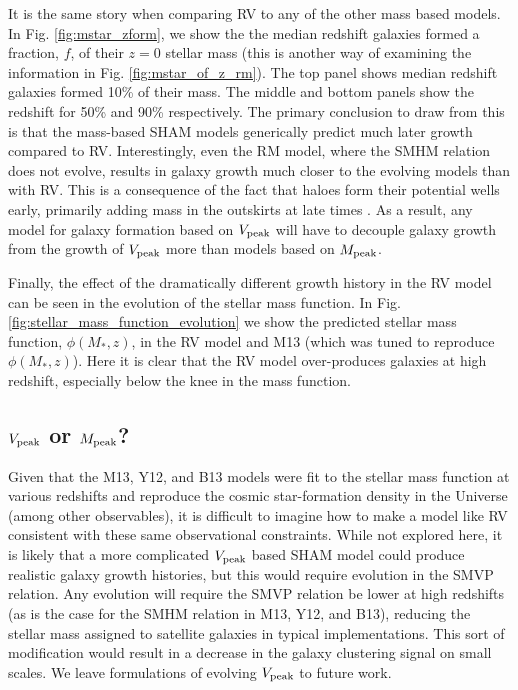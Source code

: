 \documentclass[a4paper,fleqn,usenatbib]{mnras}
\begin{document}
It is the same story when comparing RV to any of the other mass based models.  In Fig. \ref{fig:mstar_zform}, we show the the median redshift galaxies formed a fraction, $f$, of their $z=0$ stellar mass (this is another way of examining the information in Fig. \ref{fig:mstar_of_z_rm}).  The top panel shows median redshift galaxies formed 10\% of their mass.  The middle and bottom panels show the redshift for 50\% and 90\% respectively.  The primary conclusion to draw from this is that the mass-based SHAM models generically predict much later growth compared to RV.  Interestingly, even the RM model, where the SMHM relation does not evolve, results in galaxy growth much closer to the evolving models than with RV.  This is a consequence of the fact that haloes form their potential wells early, primarily adding mass in the outskirts at late times \citep{Bosch:2014cu}.  As a result, any model for galaxy formation based on $V_{\rm peak}$ will have to decouple galaxy growth from the growth of $V_{\rm peak}$ more than models based on $M_{\rm peak}$.        

Finally, the effect of the dramatically different growth history in the RV model can be seen in the evolution of the stellar mass function.  In Fig. \ref{fig:stellar_mass_function_evolution} we show the predicted stellar mass function, $\phi(M_*,z)$, in the RV model and M13 (which was tuned to reproduce $\phi(M_*,z)$).  Here it is clear that the RV model over-produces galaxies at high redshift, especially below the knee in the mass function.


\subsection{$V_{\rm peak}$ or $M_{\rm peak}$?}

Given that the M13, Y12, and B13 models were fit to the stellar mass function at various redshifts and reproduce the cosmic star-formation density in the Universe (among other observables), it is difficult to imagine how to make a model like RV consistent with these same observational constraints.  While not explored here, it is likely that a more complicated $V_{\rm peak}$ based SHAM model could produce realistic galaxy growth histories, but this would require evolution in the SMVP relation.  Any evolution will require the SMVP relation be lower at high redshifts (as is the case for the SMHM relation in M13, Y12, and B13), reducing the stellar mass assigned to satellite galaxies in typical implementations.  This sort of modification would result in a decrease in the galaxy clustering signal on small scales.  We leave formulations of evolving $V_{\rm peak}$ to future work.    
\end{document}
